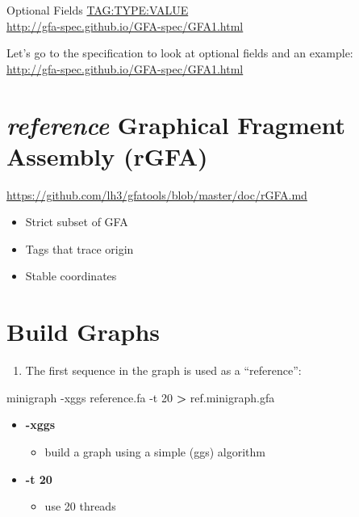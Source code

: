 \documentclass[
]{book}
\newenvironment{Shaded}{\begin{snugshade}}{\end{snugshade}}
\newcommand{\AttributeTok}[1]{\textcolor[rgb]{0.77,0.63,0.00}{#1}}
\newcommand{\ExtensionTok}[1]{#1}
\newcommand{\NormalTok}[1]{#1}
\newcommand{\OperatorTok}[1]{\textcolor[rgb]{0.81,0.36,0.00}{\textbf{#1}}}
\providecommand{\tightlist}{%
  \setlength{\itemsep}{0pt}\setlength{\parskip}{0pt}}
\begin{document}
Optional Fields \url{TAG:TYPE:VALUE}\\
\url{http://gfa-spec.github.io/GFA-spec/GFA1.html}

Let's go to the specification to look at optional fields and an example:\\
\url{http://gfa-spec.github.io/GFA-spec/GFA1.html}

\hypertarget{reference-graphical-fragment-assembly-rgfa}{%
\section{\texorpdfstring{\emph{reference} Graphical Fragment Assembly (rGFA)}{reference Graphical Fragment Assembly (rGFA)}}\label{reference-graphical-fragment-assembly-rgfa}}

\url{https://github.com/lh3/gfatools/blob/master/doc/rGFA.md}

\begin{itemize}
\tightlist
\item
  Strict subset of GFA
\item
  Tags that trace origin
\item
  Stable coordinates
\end{itemize}

\hypertarget{build-graphs}{%
\section{Build Graphs}\label{build-graphs}}

\begin{enumerate}
\def\labelenumi{\arabic{enumi}.}
\tightlist
\item
  The first sequence in the graph is used as a ``reference'':
\end{enumerate}

\begin{Shaded}
\begin{Highlighting}[]
\ExtensionTok{minigraph} \AttributeTok{{-}xggs}\NormalTok{ reference.fa }\AttributeTok{{-}t}\NormalTok{ 20 }\OperatorTok{\textgreater{}}\NormalTok{ ref.minigraph.gfa}
\end{Highlighting}
\end{Shaded}

\begin{itemize}
\tightlist
\item
  \textbf{-xggs}

  \begin{itemize}
  \tightlist
  \item
    build a graph using a simple (ggs) algorithm
  \end{itemize}
\item
  \textbf{-t 20}

  \begin{itemize}
  \tightlist
  \item
    use 20 threads
  \end{itemize}
\end{itemize}
\end{document}

